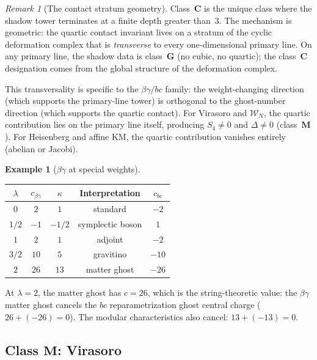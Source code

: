 \documentclass[11pt,reqno]{amsart}
\theoremstyle{definition}
\newtheorem{example}[theorem]{Example}
\theoremstyle{remark}
\newtheorem{remark}[theorem]{Remark}
\newcommand{\cW}{\mathcal{W}}
\numberwithin{equation}{section}
\begin{document}
\begin{remark}[The contact stratum
geometry]\label{rem:contact-geometry}
Class~$\mathbf{C}$ is the unique class where the shadow
tower terminates at a finite depth greater than~$3$. The
mechanism is geometric: the quartic contact invariant lives
on a stratum of the cyclic deformation complex that is
\emph{transverse} to every one-dimensional primary line.
On any primary line, the shadow data is class~$\mathbf{G}$
(no cubic, no quartic); the class~$\mathbf{C}$ designation
comes from the global structure of the deformation complex.

This transversality is specific to the $\beta\gamma/bc$
family: the weight-changing direction (which supports the
primary-line tower) is orthogonal to the ghost-number
direction (which supports the quartic contact). For Virasoro
and $\cW_N$, the quartic contribution lies on the primary
line itself, producing $S_4 \ne 0$ and $\Delta \ne 0$
(class~$\mathbf{M}$). For Heisenberg and affine KM, the
quartic contribution vanishes entirely (abelian or Jacobi).
\end{remark}

\begin{example}[$\beta\gamma$ at special
weights]\label{ex:betagamma-special}
\leavevmode
\begin{center}
\renewcommand{\arraystretch}{1.2}
\begin{tabular}{ccccc}
\toprule
$\lambda$ & $c_{\beta\gamma}$ & $\kappa$
 & Interpretation & $c_{bc}$ \\
\midrule
$0$ & $2$ & $1$ & standard & $-2$ \\
$1/2$ & $-1$ & $-1/2$ & symplectic boson & $1$ \\
$1$ & $2$ & $1$ & adjoint & $-2$ \\
$3/2$ & $10$ & $5$ & gravitino & $-10$ \\
$2$ & $26$ & $13$ & matter ghost & $-26$ \\
\bottomrule
\end{tabular}
\end{center}
At $\lambda = 2$, the matter ghost has $c = 26$, which
is the string-theoretic value: the $\beta\gamma$ matter
ghost cancels the $bc$ reparametrization ghost central
charge ($26 + (-26) = 0$). The modular characteristics
also cancel: $13 + (-13) = 0$.
\end{example}


\subsection{Class $\mathbf{M}$: Virasoro}
\label{subsec:virasoro}
\end{document}
